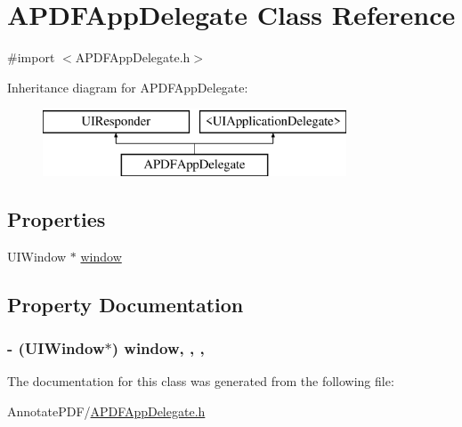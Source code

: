 \hypertarget{interface_a_p_d_f_app_delegate}{\section{A\-P\-D\-F\-App\-Delegate Class Reference}
\label{interface_a_p_d_f_app_delegate}
}


{\ttfamily \#import $<$A\-P\-D\-F\-App\-Delegate.\-h$>$}

Inheritance diagram for A\-P\-D\-F\-App\-Delegate\-:\begin{figure}[H]
\begin{center}
\leavevmode
\includegraphics[height=2.000000cm]{interface_a_p_d_f_app_delegate}
\end{center}
\end{figure}
\subsection*{Properties}
\begin{DoxyCompactItemize}
\item 
U\-I\-Window $\ast$ \hyperlink{interface_a_p_d_f_app_delegate_a233010f52c3b04f49d15ab04557d9ae5}{window}
\end{DoxyCompactItemize}


\subsection{Property Documentation}
\hypertarget{interface_a_p_d_f_app_delegate_a233010f52c3b04f49d15ab04557d9ae5}{
\subsubsection[{window}]{\setlength{\rightskip}{0pt plus 5cm}-\/ (U\-I\-Window$\ast$) window\hspace{0.3cm}{\ttfamily [read]}, {\ttfamily [write]}, {\ttfamily [nonatomic]}, {\ttfamily [strong]}}}\label{interface_a_p_d_f_app_delegate_a233010f52c3b04f49d15ab04557d9ae5}


The documentation for this class was generated from the following file\-:\begin{DoxyCompactItemize}
\item 
Annotate\-P\-D\-F/\hyperlink{_a_p_d_f_app_delegate_8h}{A\-P\-D\-F\-App\-Delegate.\-h}\end{DoxyCompactItemize}
